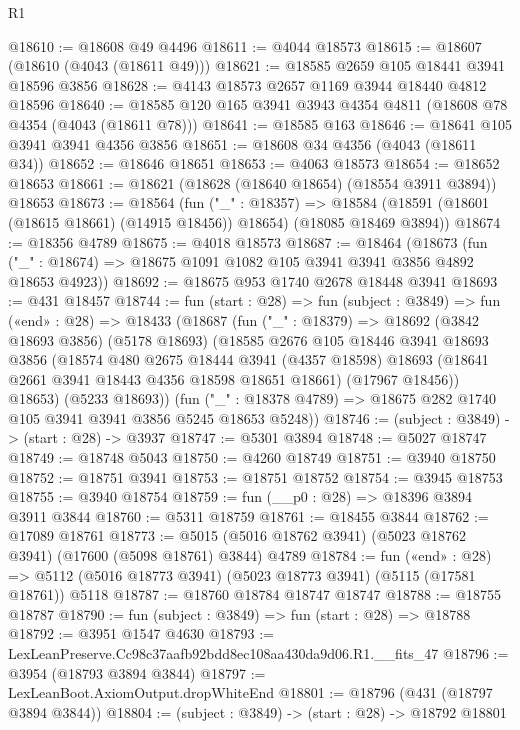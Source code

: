\begin{lexlean}{R1}
\begin{coremodule}
@18610 := @18608 @49 @4496
@18611 := @4044 @18573
@18615 := @18607 (@18610 (@4043 (@18611 @49)))
@18621 := @18585 @2659 @105 @18441 @3941 @18596 @3856
@18628 := @4143 @18573 @2657 @1169 @3944 @18440 @4812 @18596
@18640 := @18585 @120 @165 @3941 @3943 @4354 @4811 (@18608 @78 @4354 (@4043 (@18611 @78)))
@18641 := @18585 @163
@18646 := @18641 @105 @3941 @3941 @4356 @3856
@18651 := @18608 @34 @4356 (@4043 (@18611 @34))
@18652 := @18646 @18651
@18653 := @4063 @18573
@18654 := @18652 @18653
@18661 := @18621 (@18628 (@18640 @18654) (@18554 @3911 @3894)) @18653
@18673 := @18564
    (fun ("_" : @18357) =>
    @18584 (@18591 (@18601 (@18615 @18661) (@14915 @18456)) @18654) (@18085 @18469 @3894))
@18674 := @18356 @4789
@18675 := @4018 @18573
@18687 := @18464
    (@18673 (fun ("_" : @18674) => @18675 @1091 @1082 @105 @3941 @3941 @3856 @4892 @18653 @4923))
@18692 := @18675 @953 @1740 @2678 @18448 @3941
@18693 := @431 @18457
@18744 := fun (start : @28) =>
  fun (subject : @3849) =>
  fun («end» : @28) =>
  @18433
    (@18687
      (fun ("_" : @18379) =>
      @18692
        (@3842 @18693 @3856)
        (@5178 @18693)
        (@18585
          @2676
          @105
          @18446
          @3941
          @18693
          @3856
          (@18574
            @480
            @2675
            @18444
            @3941
            (@4357 @18598)
            @18693
            (@18641 @2661 @3941 @18443 @4356 @18598 @18651 @18661)
            (@17967 @18456))
          @18653)
        (@5233 @18693))
      (fun ("_" : @18378 @4789) => @18675 @282 @1740 @105 @3941 @3941 @3856 @5245 @18653 @5248))
@18746 := (subject : @3849) -> (start : @28) -> @3937
@18747 := @5301 @3894
@18748 := @5027 @18747
@18749 := @18748 @5043
@18750 := @4260 @18749
@18751 := @3940 @18750
@18752 := @18751 @3941
@18753 := @18751 @18752
@18754 := @3945 @18753
@18755 := @3940 @18754
@18759 := fun (__p0 : @28) => @18396 @3894 @3911 @3844
@18760 := @5311 @18759
@18761 := @18455 @3844
@18762 := @17089 @18761
@18773 := @5015 (@5016 @18762 @3941) (@5023 @18762 @3941) (@17600 (@5098 @18761) @3844) @4789
@18784 := fun («end» : @28) =>
  @5112 (@5016 @18773 @3941) (@5023 @18773 @3941) (@5115 (@17581 @18761)) @5118
@18787 := @18760 @18784 @18747 @18747
@18788 := @18755 @18787
@18790 := fun (subject : @3849) => fun (start : @28) => @18788
@18792 := @3951 @1547 @4630
@18793 := LexLeanPreserve.Cc98c37aafb92bdd8ec108aa430da9d06.R1.__fits_47
@18796 := @3954 (@18793 @3894 @3844)
@18797 := LexLeanBoot.AxiomOutput.dropWhiteEnd
@18801 := @18796 (@431 (@18797 @3894 @3844))
@18804 := (subject : @3849) -> (start : @28) -> @18792 @18801

\end{coremodule}
\end{lexlean}
